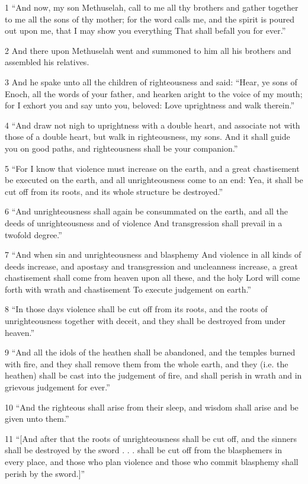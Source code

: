 \par 1 “And now, my son Methuselah, call to me all thy brothers and gather together to me all the sons of thy mother; for the word calls me, and the spirit is poured out upon me, that I may show you everything That shall befall you for ever.”
\par 2 And there upon Methuselah went and summoned to him all his brothers and assembled his relatives.
\par 3 And he spake unto all the children of righteousness and said: “Hear, ye sons of Enoch, all the words of your father, and hearken aright to the voice of my mouth; for I exhort you and say unto you, beloved: Love uprightness and walk therein.”
\par 4 “And draw not nigh to uprightness with a double heart, and associate not with those of a double heart, but walk in righteousness, my sons. And it shall guide you on good paths, and righteousness shall be your companion.”
\par 5 “For I know that violence must increase on the earth, and a great chastisement be executed on the earth, and all unrighteousness come to an end: Yea, it shall be cut off from its roots, and its whole structure be destroyed.”
\par 6 “And unrighteousness shall again be consummated on the earth, and all the deeds of unrighteousness and of violence And transgression shall prevail in a twofold degree.”
\par 7 “And when sin and unrighteousness and blasphemy And violence in all kinds of deeds increase, and apostasy and transgression and uncleanness increase, a great chastisement shall come from heaven upon all these, and the holy Lord will come forth with wrath and chastisement To execute judgement on earth.”
\par 8 “In those days violence shall be cut off from its roots, and the roots of unrighteousness together with deceit, and they shall be destroyed from under heaven.”
\par 9 “And all the idols of the heathen shall be abandoned, and the temples burned with fire, and they shall remove them from the whole earth, and they (i.e. the heathen) shall be cast into the judgement of fire, and shall perish in wrath and in grievous judgement for ever.”
\par 10 “And the righteous shall arise from their sleep, and wisdom shall arise and be given unto them.”
\par 11 “[And after that the roots of unrighteousness shall be cut off, and the sinners shall be destroyed by the sword . . . shall be cut off from the blasphemers in every place, and those who plan violence and those who commit blasphemy shall perish by the sword.]”
